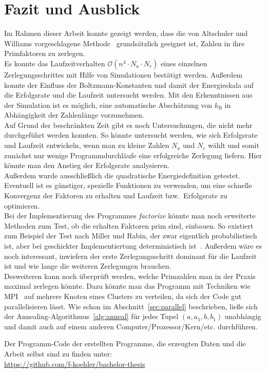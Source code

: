 \chapter{Fazit und Ausblick}\label{ch:conclusion}
Im Rahmen dieser Arbeit konnte gezeigt werden, dass die von Altschuler und Williams vorgeschlagene Methode~\parencite{altschuler} grundsätzlich geeignet ist, Zahlen in ihre Primfaktoren zu zerlegen. \\
Es konnte das Laufzeitverhalten $\mathcal{O}\left(n^4\cdot N_a \cdot N_c\right)$ eines einzelnen Zerlegungsschrittes mit Hilfe von Simulationen bestätigt werden. Außerdem konnte der Einfluss der Boltzmann-Konstanten und damit der Energieskala auf die Erfolgsrate und die Laufzeit untersucht werden. Mit den Erkenntnissen aus der Simulation ist es möglich, eine automatische Abschätzung von $k_\mathrm{B}$ in Abhängigkeit der Zahlenlänge vorzunehmen. \\
Auf Grund der beschränkten Zeit gibt es noch Untersuchungen, die nicht mehr durchgeführt werden konnten. So könnte untersucht werden, wie sich Erfolgsrate und Laufzeit entwickeln, wenn man zu kleine Zahlen $N_a$ und $N_c$ wählt und somit zunächst nur wenige Programmdurchläufe eine erfolgreiche Zerlegung liefern. Hier könnte man den Anstieg der Erfolgsrate analysieren.\\
Außerdem wurde ausschließlich die quadratische Energiedefinition getestet. Eventuell ist es günstiger, spezielle Funktionen zu verwenden, um eine schnelle Konvergenz der Faktoren zu erhalten und Laufzeit bzw.\ Erfolgsrate zu optimieren. \\
Bei der Implementierung des Programmes \textit{factorize} könnte man noch erweiterte Methoden zum Test, ob die erhalten Faktoren prim sind, einbauen. So existiert zum Beispiel der Test nach Miller und Rabin, der zwar eigentlich probabilistisch ist, aber bei geschickter Implementiertung deterministisch ist~\parencite{miller}. Außerdem wäre es noch interessant, inwiefern der erste Zerlegungsschritt dominant für die Laufzeit ist und wie lange die weiteren Zerlegungen brauchen. \\
Desweiteren kann noch überprüft werden, welche Primzahlen man in der Praxis maximal zerlegen könnte. Dazu könnte man das Programm mit Techniken wie MPI~\parencite{mpi} auf mehrere Knoten eines Clusters zu verteilen, da sich der Code gut parallelisieren lässt. Wie schon im Abschnitt~\ref{sec:parallel} beschrieben, ließe sich der Annealing-Algorithmus~\ref{alg:anneal} für jedes Tupel $\left(a,a_1,b,b_1\right)$ unabhängig und damit auch auf einem anderen Computer/Prozessor/Kern/etc. durchführen.

\vfill
Der Programm-Code der erstellten Programme, die erzeugten Daten und die Arbeit selbst sind zu finden unter:\\
\url{https://github.com/f-koehler/bachelor-thesis}
